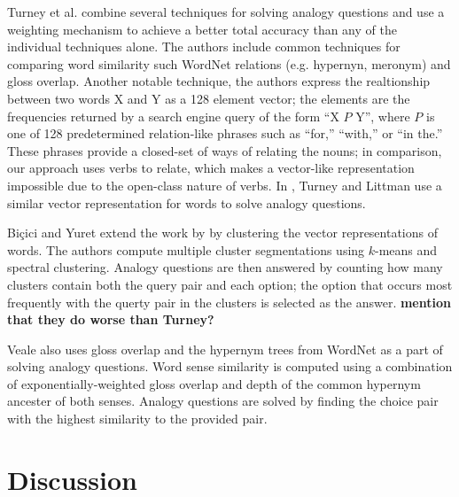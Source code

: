 \documentclass[11pt]{article}
\begin{document}
Turney et al. combine several techniques for solving analogy questions and use a
weighting mechanism to achieve a better total accuracy than any of the
individual techniques alone\cite{turney03combining}.  The authors include common
techniques for comparing word similarity such WordNet relations (e.g. hypernyn,
meronym) and gloss overlap.  Another notable technique, the authors express the
realtionship between two words X and Y as a 128 element vector; the elements are
the frequencies returned by a search engine query of the form ``X $P$ Y'', where
$P$ is one of 128 predetermined relation-like phrases such as ``for,'' ``with,''
or ``in the.''  These phrases provide a closed-set of ways of relating the
nouns; in comparison, our approach uses verbs to relate, which makes a
vector-like representation impossible due to the open-class nature of verbs.  In
\cite{turney05corpus}, Turney and Littman use a similar vector representation
for words to solve analogy questions.

Bi\c{c}ici and Yuret extend the work by \cite{turney05corpus} by clustering the
vector representations of words\cite{bicici06clustering}.  The authors compute
multiple cluster segmentations using $k$-means and spectral clustering.  Analogy
questions are then answered by counting how many clusters contain both the query
pair and each option; the option that occurs most frequently with the querty
pair in the clusters is selected as the answer.  {\bf mention that they do worse
  than Turney?}

Veale also uses gloss overlap and the hypernym trees from WordNet as a part of
solving analogy questions\cite{veale04wordnet}.  Word sense similarity is
computed using a combination of exponentially-weighted gloss overlap and depth
of the common hypernym ancester of both senses.  Analogy questions are solved by
finding the choice pair with the highest similarity to the provided pair.

\section{Discussion}
\label{sec:discussion}
\end{document}
